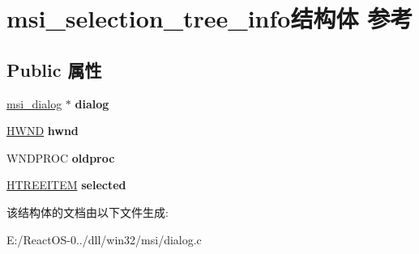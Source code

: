 \hypertarget{structmsi__selection__tree__info}{}\section{msi\+\_\+selection\+\_\+tree\+\_\+info结构体 参考}
\label{structmsi__selection__tree__info}
\subsection*{Public 属性}
\begin{DoxyCompactItemize}
\item 
\mbox{\label{structmsi__selection__tree__info_ae5a62f2495e41b6e2df3a419adf3b7db}} 
\hyperlink{structmsi__dialog__tag}{msi\+\_\+dialog} $\ast$ {\bfseries dialog}
\item 
\mbox{\label{structmsi__selection__tree__info_a53db1e9b861519df2bb032f12a55d95e}} 
\hyperlink{interfacevoid}{H\+W\+ND} {\bfseries hwnd}
\item 
\mbox{\label{structmsi__selection__tree__info_a628bcd7096cea612bd70e1a48a6f4add}} 
W\+N\+D\+P\+R\+OC {\bfseries oldproc}
\item 
\mbox{\label{structmsi__selection__tree__info_ae54987b24258e183b57fe15abbc9f7d2}} 
\hyperlink{struct___t_r_e_e_i_t_e_m}{H\+T\+R\+E\+E\+I\+T\+EM} {\bfseries selected}
\end{DoxyCompactItemize}


该结构体的文档由以下文件生成\+:\begin{DoxyCompactItemize}
\item 
E\+:/\+React\+O\+S-\/0../dll/win32/msi/dialog.\+c\end{DoxyCompactItemize}
